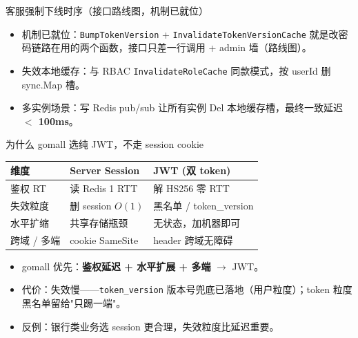 \documentclass[aspectratio=169,11pt]{beamer}
\begin{document}
\begin{frame}[shrink]{客服强制下线时序（接口路线图，机制已就位）}
\vspace{2mm}
\begin{itemize}
  \item 机制已就位：\texttt{BumpTokenVersion} + \texttt{InvalidateTokenVersionCache} 就是改密码链路在用的两个函数，接口只差一行调用 + admin 墙（路线图）。
  \item 失效本地缓存：与 RBAC \texttt{InvalidateRoleCache} 同款模式，按 userId 删 sync.Map 槽。
  \item 多实例场景：写 Redis pub/sub 让所有实例 Del 本地缓存槽，最终一致延迟 \textbf{$<$ 100ms}。
\end{itemize}
\end{frame}

\begin{frame}[shrink]{为什么 gomall 选纯 JWT，不走 session cookie}
\begin{tabular}{@{}lll@{}}
\toprule
维度 & Server Session & JWT (双 token) \\
\midrule
鉴权 RT     & 读 Redis 1 RTT      & 解 HS256 零 RTT \\
失效粒度    & 删 session $O(1)$   & 黑名单 / token\_version \\
水平扩缩    & 共享存储瓶颈        & 无状态，加机器即可 \\
跨域 / 多端 & cookie SameSite     & header 跨域无障碍 \\
\bottomrule
\end{tabular}
\vspace{2mm}
\begin{itemize}
  \item gomall 优先：\textbf{鉴权延迟 + 水平扩展 + 多端} $\to$ JWT。
  \item 代价：失效慢——\texttt{token\_version} 版本号兜底已落地（用户粒度）；token 粒度黑名单留给"只踢一端"。
  \item 反例：银行类业务选 session 更合理，失效粒度比延迟重要。
\end{itemize}
\end{frame}
\end{document}
